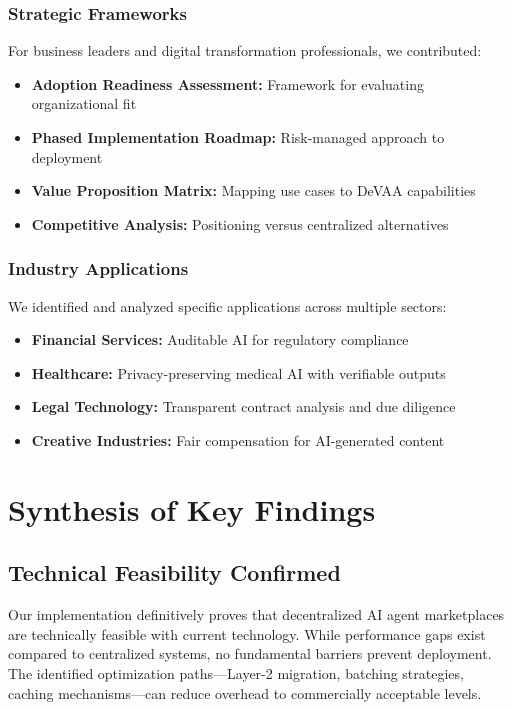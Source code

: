 \subsubsection{Strategic Frameworks}
For business leaders and digital transformation professionals, we contributed:
\begin{itemize}
    \item \textbf{Adoption Readiness Assessment:} Framework for evaluating organizational fit
    \item \textbf{Phased Implementation Roadmap:} Risk-managed approach to deployment
    \item \textbf{Value Proposition Matrix:} Mapping use cases to DeVAA capabilities
    \item \textbf{Competitive Analysis:} Positioning versus centralized alternatives
\end{itemize}

\subsubsection{Industry Applications}
We identified and analyzed specific applications across multiple sectors:
\begin{itemize}
    \item \textbf{Financial Services:} Auditable AI for regulatory compliance
    \item \textbf{Healthcare:} Privacy-preserving medical AI with verifiable outputs
    \item \textbf{Legal Technology:} Transparent contract analysis and due diligence
    \item \textbf{Creative Industries:} Fair compensation for AI-generated content
\end{itemize}

\section{Synthesis of Key Findings}

\subsection{Technical Feasibility Confirmed}
Our implementation definitively proves that decentralized AI agent marketplaces are technically feasible with current technology. While performance gaps exist compared to centralized systems, no fundamental barriers prevent deployment. The identified optimization paths—Layer-2 migration, batching strategies, caching mechanisms—can reduce overhead to commercially acceptable levels.


